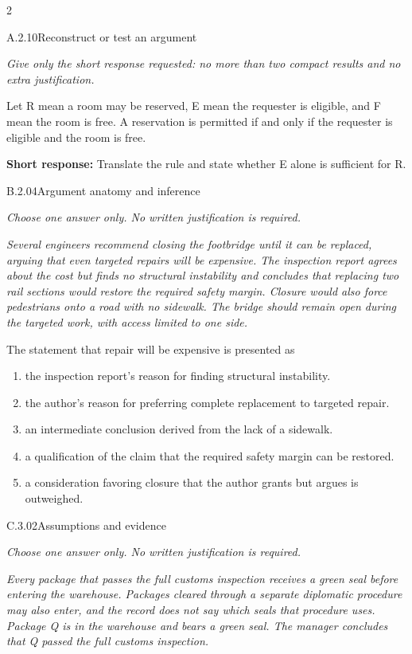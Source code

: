 \documentclass[9pt]{extarticle}
\newcommand{\choice}[1]{\item #1}
\begin{document}
\CoreWorkArea
\FormBreak
{}
\begin{multicols}{2}
\begin{DenseCoreProblem}{A.2.10}{Reconstruct or test an argument}
{\scriptsize\textit{Give only the short response requested: no more than two compact results and no extra justification.}\par}
Let R mean a room may be reserved, E mean the requester is eligible, and F mean the room is free. A reservation is permitted if and only if the requester is eligible and the room is free.

\textbf{Short response:} Translate the rule and state whether E alone is sufficient for R.
\end{DenseCoreProblem}
\begin{DenseCoreProblem}{B.2.04}{Argument anatomy and inference}
{\scriptsize\textit{Choose one answer only. No written justification is required.}\par}
\emph{Several engineers recommend closing the footbridge until it can be replaced, arguing that even targeted repairs will be expensive. The inspection report agrees about the cost but finds no structural instability and concludes that replacing two rail sections would restore the required safety margin. Closure would also force pedestrians onto a road with no sidewalk. The bridge should remain open during the targeted work, with access limited to one side.}

The statement that repair will be expensive is presented as
\begin{enumerate}[label=(\alph*)]
  \choice{the inspection report's reason for finding structural instability.}
  \choice{the author's reason for preferring complete replacement to targeted repair.}
  \choice{an intermediate conclusion derived from the lack of a sidewalk.}
  \choice{a qualification of the claim that the required safety margin can be restored.}
  \choice{a consideration favoring closure that the author grants but argues is outweighed.}
\end{enumerate}
\end{DenseCoreProblem}
\columnbreak
\begin{DenseCoreProblem}{C.3.02}{Assumptions and evidence}
{\scriptsize\textit{Choose one answer only. No written justification is required.}\par}
\emph{Every package that passes the full customs inspection receives a green seal before entering the warehouse. Packages cleared through a separate diplomatic procedure may also enter, and the record does not say which seals that procedure uses. Package Q is in the warehouse and bears a green seal. The manager concludes that Q passed the full customs inspection.}


\end{DenseCoreProblem}
\end{multicols}
\end{document}
